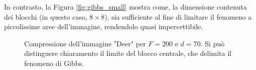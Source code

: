 In contrasto, la Figura \ref{fig:gibbs_small} mostra come, la dimensione contenuta dei blocchi (in questo caso, $8 \times 8$), sia sufficiente al fine di limitare il fenomeno a piccolissime aree dell'immagine, rendendolo quasi impercettibile.

\begin{figure}%
	\centering
	\caption{Compressione dell'immagine "Deer" per $F=200$ e $d=70$. Si può distinguere chiaramento il limite del blocco centrale, che delimita il fenomeno di Gibbs.}%
	\label{fig:gibbs}
\end{figure}

